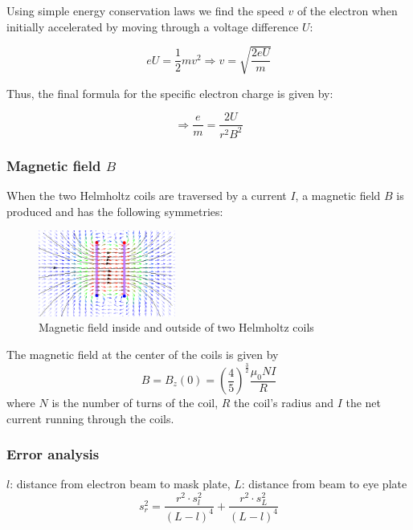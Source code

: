 \documentclass{scrreprt}
\begin{document}
Using simple energy conservation laws we find the speed $v$ of the electron when initially accelerated by moving through a voltage difference $U$:

\begin{equation}
e U = \frac{1}{2} m v^2 \Longrightarrow v = \sqrt{\frac{2 e U}{m}}
\end{equation}

Thus, the final formula for the specific electron charge is given by:

\begin{equation}
\boxed{\Longrightarrow \frac{e}{m} = \frac{2 U}{r^2 B^2}}
\end{equation}

\subsubsection{Magnetic field $B$}
When the two Helmholtz coils are traversed by a current $I$, a magnetic field $B$ is produced and has the following symmetries:

\begin{figure}[H]
	\centering
  \includegraphics[width=0.4\textwidth]{img/coils.png}
	\caption{Magnetic field inside and outside of two Helmholtz coils}
	\label{fig:coils}
\end{figure}

The magnetic field at the center of the coils is given by
\begin{equation}
B= B_z (0) = \left( \frac{4}{5}\right)^{\frac{3}{2}} \frac{\mu_0 N I}{R}
\end{equation}
where $N$ is the number of turns of the coil, $R$ the coil's radius and $I$ the net current running through the coils.

\subsubsection{Error analysis}
$l$: distance from electron beam to mask plate, $L$: distance from beam to eye plate
\begin{equation}
s_r^2 = \frac{r^2\cdot s_l^2}{(L-l)^4} + \frac{r^2\cdot s_L^2}{(L-l)^4}
\end{equation}
\end{document}
